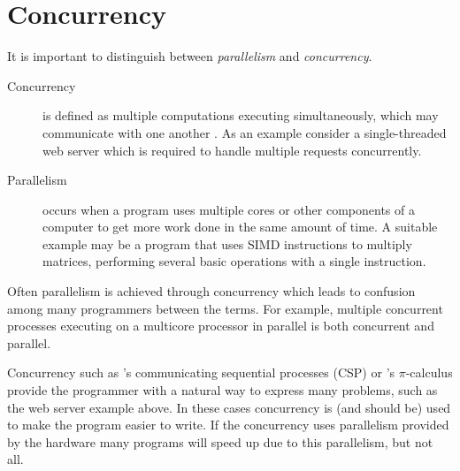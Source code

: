 
%


\section{Concurrency}
\label{sec:intro_concurrency}

It is important to distinguish between \emph{parallelism} and
\emph{concurrency}.

\begin{description}
    \item[Concurrency] is defined as multiple computations executing simultaneously,
    which may communicate with one another \citep{hoare:1978:csp}.
    As an example consider a single-threaded web server which is required to
    handle multiple requests concurrently.

    \item[Parallelism] occurs when a program uses multiple cores or other
    components of a computer to get more work done in the same amount of
    time.
    A suitable example may be a program that uses SIMD instructions to
    multiply matrices, performing several basic operations with a single
    instruction.
\end{description}

\noindent
Often parallelism is achieved through concurrency
which leads to confusion among many programmers between the terms.
For example,
multiple concurrent processes executing on a multicore processor in parallel
is both concurrent and parallel.

Concurrency such as \citet{hoare:1978:csp}'s
communicating sequential processes (CSP)
or \citet{milner:pi}'s $\pi$-calculus
provide the programmer with a natural way to express many problems,
such as the web server example above.
In these cases concurrency is (and should be) used to make the program
easier to write.
If the concurrency uses parallelism provided by the hardware many programs
will speed up due to this parallelism,
but not all.

